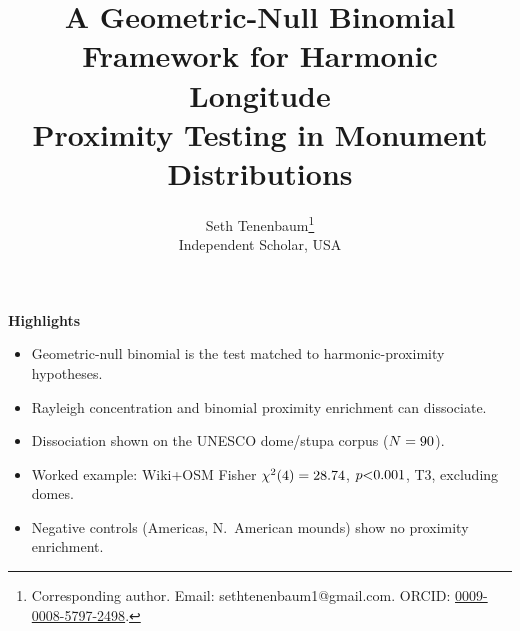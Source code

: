 \documentclass[12pt,a4paper]{article}
\begin{document}
\title{A Geometric-Null Binomial Framework for Harmonic Longitude\\
Proximity Testing in Monument Distributions}

\author{Seth Tenenbaum\thanks{Corresponding author. Email: sethtenenbaum1@gmail.com.
ORCID: \href{https://orcid.org/0009-0008-5797-2498}{0009-0008-5797-2498}.}\\
\small Independent Scholar, USA}

\date{}

\maketitle

\noindent\textbf{Highlights}
\begin{itemize}\setlength\itemsep{0pt}
  \item Geometric-null binomial is the test matched to harmonic-proximity hypotheses.
  \item Rayleigh concentration and binomial proximity enrichment can dissociate.
  \item Dissociation shown on the UNESCO dome/stupa corpus ($N=90{}$).
  \item Worked example: Wiki+OSM Fisher $\chi^2(4)=28.74{}$, $p{<}0.001{}$, T3, excluding domes.
  \item Negative controls (Americas, N.\ American mounds) show no proximity enrichment.
\end{itemize}

\bigskip
\end{document}
